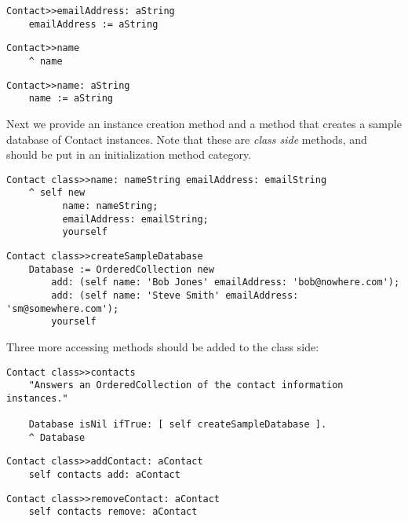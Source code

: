 \documentclass[a4paper,10pt,twoside]{book}
\newcommand{\ct}[1]{{\small\ttfamily\textup{#1}}}
\begin{document}
\begin{lstlisting}
Contact>>emailAddress: aString
    emailAddress := aString
\end{lstlisting}

\begin{lstlisting}
Contact>>name
    ^ name
\end{lstlisting}

\begin{lstlisting}
Contact>>name: aString
    name := aString
\end{lstlisting}

Next we provide an instance creation method and a method that creates a sample database of \ct{Contact} instances. Note that these are \textit{class side} methods, and should be put in an \ct{initialization} method category.

\begin{lstlisting}
Contact class>>name: nameString emailAddress: emailString
    ^ self new
          name: nameString;
          emailAddress: emailString;
          yourself
\end{lstlisting}

\begin{lstlisting}
Contact class>>createSampleDatabase
    Database := OrderedCollection new
        add: (self name: 'Bob Jones' emailAddress: 'bob@nowhere.com');
        add: (self name: 'Steve Smith' emailAddress: 'sm@somewhere.com');
        yourself
\end{lstlisting}

Three more \ct{accessing} methods should be added to the class side:

\begin{lstlisting}
Contact class>>contacts
    "Answers an OrderedCollection of the contact information instances."

    Database isNil ifTrue: [ self createSampleDatabase ].
    ^ Database
\end{lstlisting}

\begin{lstlisting}
Contact class>>addContact: aContact
    self contacts add: aContact
\end{lstlisting}

\begin{lstlisting}
Contact class>>removeContact: aContact
    self contacts remove: aContact
\end{lstlisting}
\end{document}
